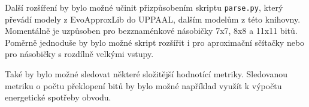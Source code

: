 Další rozšíření by bylo možné učinit přizpůsobením skriptu \texttt{parse.py}, který převádí modely z EvoApproxLib do UPPAAL, dalším modelům z této knihovny. Momentálně je uzpůsoben pro bezznaménkové násobičky 7x7, 8x8 a 11x11 bitů. Poměrně jednoduše by bylo možné skript rozšířit i pro aproximační sčítačky nebo pro násobičky s rozdílně velkými vstupy.

Také by bylo možné sledovat některé složitější hodnotící metriky. Sledovanou metriku o počtu překlopení bitů by bylo možné například využít k výpočtu energetické spotřeby obvodu.


%
